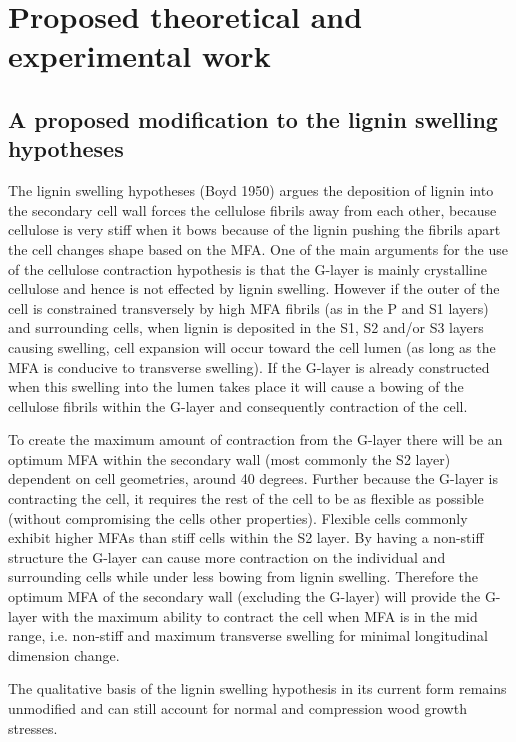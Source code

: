 \documentclass{article}
\begin{document}
\section{Proposed theoretical and experimental work}

\subsection{A proposed modification to the lignin swelling hypotheses}
The lignin swelling hypotheses (Boyd 1950) argues the deposition of lignin into
the secondary cell wall forces the cellulose fibrils away from each other, because
cellulose is very stiff when it bows because of the lignin pushing the fibrils
apart the cell changes shape based on the MFA. One of the main arguments for the
use of the cellulose contraction hypothesis is that the G-layer is mainly
crystalline cellulose and hence is not effected by lignin swelling. However if
the outer of the cell is constrained transversely by high MFA fibrils (as in the
P and S1 layers) and surrounding cells, when lignin is deposited in the S1, S2
and/or S3 layers causing swelling, cell expansion will occur toward the cell
lumen (as long as the MFA is conducive to transverse swelling). If the G-layer
is already constructed when this swelling into the lumen takes place it will
cause a bowing of the cellulose fibrils within the G-layer and consequently
contraction of the cell.

To create the maximum amount of contraction from the G-layer there will be an
optimum MFA within the secondary wall (most commonly the S2 layer) dependent on cell
geometries, around 40 degrees. Further because the G-layer is contracting the
cell, it requires the rest of the cell to be as flexible as possible (without
compromising the cells other properties). Flexible cells commonly exhibit higher
MFAs than stiff cells within the S2 layer. By having a non-stiff structure the
G-layer can cause more contraction on the individual and surrounding cells while
under less bowing from lignin swelling. Therefore the optimum MFA of the secondary
wall (excluding the G-layer) will provide the G-layer with the maximum ability
to contract the cell when MFA is in the mid range, i.e. non-stiff and maximum
transverse swelling for minimal longitudinal dimension change.

The qualitative basis of the lignin swelling hypothesis in its current form
remains unmodified and can still account for normal and compression wood growth
stresses.
\end{document}

